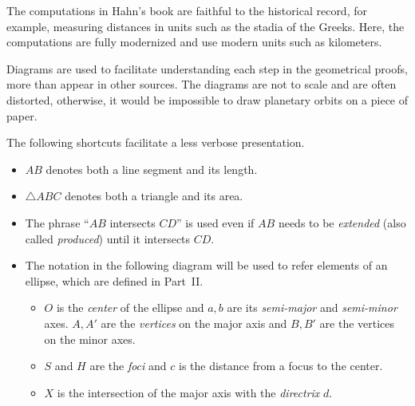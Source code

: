 The computations in Hahn's book are faithful to the historical record, for example, measuring distances in units such as the stadia of the Greeks. Here,  the computations are fully modernized and use modern units such as kilometers. 

Diagrams are used to facilitate understanding each step in the geometrical proofs, more than appear in other sources. The diagrams are not to scale and are often distorted, otherwise, it would be impossible to draw planetary orbits on a piece of paper.

The following shortcuts facilitate a less verbose presentation.
\begin{itemize}

\item $AB$ denotes both a line segment and its length.
\item $\triangle ABC$ denotes both a triangle and its area.
\item The phrase ``$AB$ intersects $CD$'' is used even if $AB$ needs to be \emph{extended} (also called \emph{produced}) until it intersects $CD$.
\begin{center}
\end{center}
\item The notation in the following diagram will be used to refer elements of an ellipse, which are defined in Part~II.
\begin{itemize}
\item $O$ is the \emph{center} of the ellipse and $a,b$ are its \emph{semi-major} and \emph{semi-minor} axes. $A,A'$ are the \emph{vertices} on the major axis and $B,B'$ are the vertices on the minor axes.
\item $S$ and $H$ are the \emph{foci} and $c$ is the distance from a focus to the center.
\item $X$ is the intersection of the major axis with the \emph{directrix} $d$.
\end{itemize}
\end{itemize}

